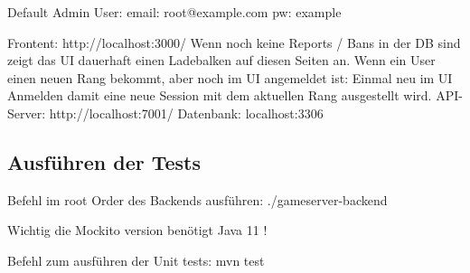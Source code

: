 Default Admin User: email: root@example.com pw: example




Frontent: http://localhost:3000/
Wenn noch keine Reports / Bans in der DB sind zeigt das UI dauerhaft einen Ladebalken auf diesen Seiten an.
Wenn ein User einen neuen Rang bekommt, aber noch im UI angemeldet ist: Einmal neu im UI Anmelden damit eine neue Session mit dem aktuellen Rang ausgestellt wird.
\newline
API-Server: http://localhost:7001/
\newline
Datenbank: localhost:3306



\subsection{Ausführen der Tests}

Befehl im root Order des Backends ausführen: ./gameserver-backend

Wichtig die Mockito version benötigt Java 11 !

Befehl zum ausführen der Unit tests: mvn test